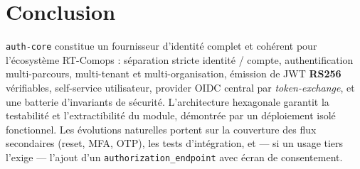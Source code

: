 \documentclass[11pt,a4paper,oneside]{report}
\newcommand{\code}[1]{\texttt{\small #1}}
\begin{document}
\chapter{Conclusion}
\code{auth-core} constitue un fournisseur d'identité complet et cohérent pour l'écosystème
RT-Comops : séparation stricte identité / compte, authentification multi-parcours,
multi-tenant et multi-organisation, émission de JWT \textbf{RS256} vérifiables, self-service
utilisateur, provider OIDC central par \emph{token-exchange}, et une batterie d'invariants de
sécurité. L'architecture hexagonale garantit la testabilité et l'extractibilité du module,
démontrée par un déploiement isolé fonctionnel. Les évolutions naturelles portent sur la
couverture des flux secondaires (reset, MFA, OTP), les tests d'intégration, et — si un usage
tiers l'exige — l'ajout d'un \code{authorization\_endpoint} avec écran de consentement.
\end{document}

